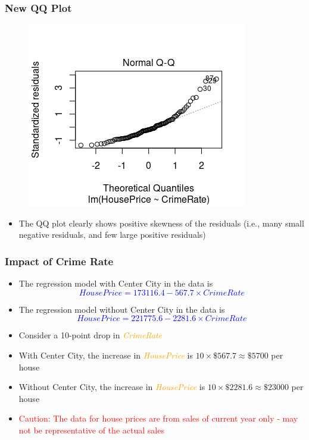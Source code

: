 \documentclass[compress]{beamer}
\begin{document}
\begin{frame}
\frametitle{\sc New QQ Plot}
    \begin{figure}[!ht]
		\centering
		\includegraphics[scale=0.7]{figs8/QQ-new.png}
	\end{figure}
\begin{itemize}
\item The QQ plot clearly shows positive skewness of the residuals (i.e., many small negative residuals, and few large positive residuals)
\end{itemize}
\end{frame}

\begin{frame}
	\frametitle{\sc Impact of Crime Rate}
	\begin{itemize}
		\item The regression model with Center City in the data is
		\textcolor{blue}{\[
		House Price = 173116.4 - 567.7 \times Crime Rate
		\]}
		\item The regression model without Center City in the data is
		\textcolor{blue}{\[
		House Price = 221775.6 - 2281.6 \times Crime Rate
		\]}
		\item Consider a 10-point drop in \textcolor{orange}{\textit{CrimeRate}}
		\item With Center City, the increase in \textcolor{orange}{\textit{HousePrice}} is $10 \times \$567.7 \approx \$5700$ per house
		\item Without Center City, the increase in \textcolor{orange}{\textit{HousePrice}} is $10 \times \$2281.6 \approx \$23000$ per house
		\item \textcolor{red}{Caution: The data for house prices are from sales of current year only - may not be representative of the actual sales}
	\end{itemize}
\end{frame}
\end{document}
